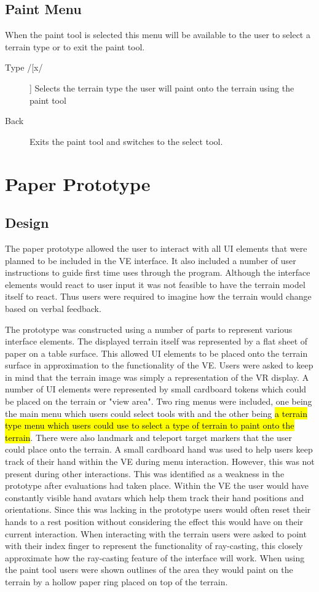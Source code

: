 \documentclass{sig-alternate-05-2015}
\begin{document}
\subsection{Paint Menu}
When the paint tool is selected this menu will be available to the user to select a terrain type or to exit the paint tool.

\begin{description}
	\item[Type /[x/]] Selects the terrain type the user will paint onto the terrain using the paint tool
	\item [Back] Exits the paint tool and switches to the select tool.
\end{description}
\section{Paper Prototype}
\subsection{Design}
The paper prototype allowed the user to interact with all UI elements that were planned to be included in the VE interface. It also included a number of user instructions to guide first time uses through the program. Although the interface elements would react to user input it was not feasible to have the terrain model itself to react. Thus users were required to imagine how the terrain would change based on verbal feedback.

The prototype was constructed using a number of parts to represent various interface elements. The displayed terrain itself was represented by a flat sheet of paper on a table surface. This allowed UI elements to be placed onto the terrain surface in approximation to the functionality of the VE. Users were asked to keep in mind that the terrain image was simply a representation of the VR display. A number of UI elements were represented by small cardboard tokens which could be placed on the terrain or "view area". Two ring menus were included, one being the main menu which users could select tools with and the other being \hl{a terrain type menu which users could use to select a type of terrain to paint onto the terrain}. There were also landmark and teleport target markers that the user could place onto the terrain. 
A small cardboard hand was used to help users keep track of their hand within the VE during menu interaction. However, this was not present during other interactions. This was identified as a weakness in the prototype after evaluations had taken place. Within the VE the user would have constantly visible hand avatars which help them track their hand positions and orientations. Since this was lacking in the prototype users would often reset their hands to a rest position without considering the effect this would have on their current interaction.
When interacting with the terrain users were asked to point with their index finger to represent the functionality of ray-casting, this closely approximate how the ray-casting feature of the interface will work. When using the paint tool users were shown outlines of the area they would paint on the terrain by a hollow paper ring placed on top of the terrain.
\end{document}
